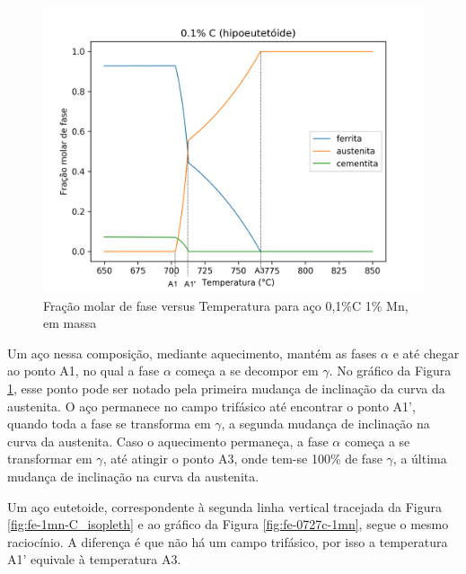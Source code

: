 \documentclass[brazil,tese,epusp]{usp}
\begin{document}
\begin{figure}[ht!]
  \includegraphics[width=1.1\textwidth]{img/Fe-Mn-01C_edited.png}
  \caption{Fração molar de fase versus Temperatura para aço 0,1\%C 1\% Mn, em massa}
  \label{fig:fe-01c-1mn}
\end{figure}

Um aço nessa composição, mediante aquecimento, mantém as fases $\alpha$ e  até chegar ao ponto A1, no qual a fase $\alpha$ começa a se decompor em $\gamma$. No gráfico da Figura \ref{fig:fe-01c-1mn}, esse ponto pode ser notado pela primeira mudança de inclinação da curva da austenita. O aço permanece no campo trifásico até encontrar o ponto A1', quando toda a fase  se transforma em $\gamma$, a segunda mudança de inclinação na curva da austenita. Caso o aquecimento permaneça, a fase $\alpha$ começa a se transformar em $\gamma$, até atingir o ponto A3, onde tem-se 100\% de fase $\gamma$, a última mudança de inclinação na curva da austenita.

Um aço eutetoide, correspondente à segunda linha vertical tracejada da Figura \ref{fig:fe-1mn-C_isopleth} e ao gráfico da Figura \ref{fig:fe-0727c-1mn}, segue o mesmo raciocínio. A diferença é que não há um campo trifásico, por isso a temperatura A1' equivale à temperatura A3.
\end{document}
